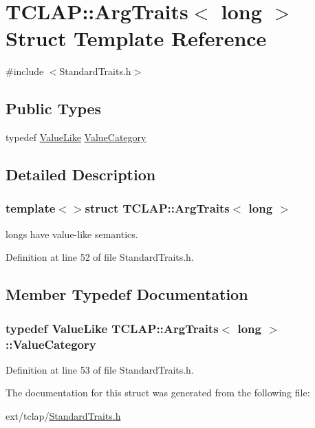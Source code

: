 \hypertarget{struct_t_c_l_a_p_1_1_arg_traits_3_01long_01_4}{}\section{T\+C\+L\+A\+P\+:\+:Arg\+Traits$<$ long $>$ Struct Template Reference}
\label{struct_t_c_l_a_p_1_1_arg_traits_3_01long_01_4}


{\ttfamily \#include $<$Standard\+Traits.\+h$>$}

\subsection*{Public Types}
\begin{DoxyCompactItemize}
\item 
typedef \hyperlink{struct_t_c_l_a_p_1_1_value_like}{Value\+Like} \hyperlink{struct_t_c_l_a_p_1_1_arg_traits_3_01long_01_4_a942d9a1e813bc3f82b51a2dcedb7316d}{Value\+Category}
\end{DoxyCompactItemize}


\subsection{Detailed Description}
\subsubsection*{template$<$$>$struct T\+C\+L\+A\+P\+::\+Arg\+Traits$<$ long $>$}

longs have value-\/like semantics. 

Definition at line 52 of file Standard\+Traits.\+h.



\subsection{Member Typedef Documentation}
\hypertarget{struct_t_c_l_a_p_1_1_arg_traits_3_01long_01_4_a942d9a1e813bc3f82b51a2dcedb7316d}{}
\subsubsection[{Value\+Category}]{\setlength{\rightskip}{0pt plus 5cm}typedef {\bf Value\+Like} {\bf T\+C\+L\+A\+P\+::\+Arg\+Traits}$<$ long $>$\+::{\bf Value\+Category}}\label{struct_t_c_l_a_p_1_1_arg_traits_3_01long_01_4_a942d9a1e813bc3f82b51a2dcedb7316d}


Definition at line 53 of file Standard\+Traits.\+h.



The documentation for this struct was generated from the following file\+:\begin{DoxyCompactItemize}
\item 
ext/tclap/\hyperlink{_standard_traits_8h}{Standard\+Traits.\+h}\end{DoxyCompactItemize}
